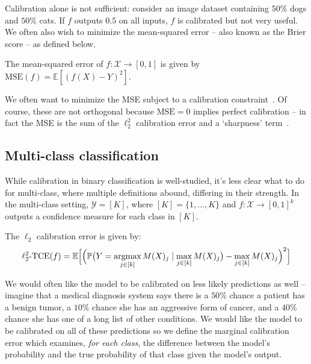 Calibration alone is not sufficient: consider an image dataset containing $50\%$ dogs and $50\%$ cats.
If $f$ outputs $0.5$ on all inputs, $f$ is calibrated but not very useful.
We often also wish to minimize the mean-squared error -- also known as the Brier score -- as defined below.

\begin{definition}
The mean-squared error of $f : \mathcal{X} \to [0, 1]$ is given by $\mbox{MSE}(f) = \mathbb{E}[(f(X) - Y)^2]$.
\end{definition}

We often want to minimize the MSE subject to a calibration constraint~\cite{gneiting2005weather, gneiting2007probabilistic}. Of course, these are not orthogonal because $\mbox{MSE} = 0$ implies perfect calibration -- in fact the MSE is the sum of the $\ell_2^2$ calibration error and a `sharpness' term~\cite{murphy1973vector,degroot1983forecasters, kuleshov2015calibrated}.

\subsection{Multi-class classification}

While calibration in binary classification is well-studied,
it's less clear what to do for multi-class, where multiple definitions abound, differing in their strength. In the multi-class setting, $\mathcal{Y} = [K]$, where $[K] = \{1, \dots, K\}$ and $f : \mathcal{X} \to [0, 1]^k$ outputs a confidence measure for each class in $[K]$.

\begin{definition}
The $\ell_2$ calibration error is given by:
\begin{align}
\ell_2^2\mbox{-TCE}(f) = \mathbb{E}\Big[ \Big( \mathbb{P}\big(Y = \mathop{\mbox{argmax}}_{j \in [k]} M(X)_j \mid \max_{j \in [k]} M(X)_j\big) - \max_{j \in [k]} M(X)_j \Big)^2 \Big]
\end{align}
\end{definition}

We would often like the model to be calibrated on less likely predictions as well -- imagine that a medical diagnosis system says there is a $50\%$ chance a patient has a benign tumor, a $10\%$ chance she has an aggressive form of cancer, and a $40\%$ chance she has one of a long list of other conditions. We would like the model to be calibrated on all of these predictions so we define the marginal calibration error which examines, \emph{for each class}, the difference between the model's probability and the true probability of that class given the model's output.

